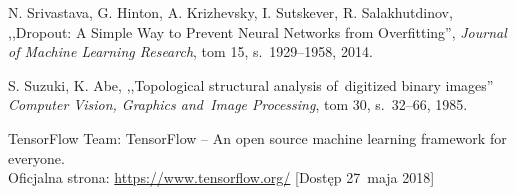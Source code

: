 \documentclass[11pt,a4paper]{article}
\begin{document}
\begin{thebibliography}{99}
        N. Srivastava,
        G. Hinton,
        A. Krizhevsky,
        I. Sutskever,
        R. Salakhutdinov,
        ,,Dropout: A Simple Way to Prevent Neural Networks from Overfitting'',
        \emph{Journal of Machine Learning Research},
        tom 15,
        s.~1929--1958,
        2014.

        S. Suzuki,
        K. Abe,
        ,,Topological structural analysis of~digitized binary images''
        \emph{Computer Vision, Graphics and~Image Processing},
        tom 30,
        s.~32--66,
        1985.

        TensorFlow Team:
        TensorFlow -- An open source machine learning framework for everyone. \\
        Oficjalna strona: \url{https://www.tensorflow.org/}
        [Dostęp 27~maja 2018]

\end{thebibliography}
\end{document}
